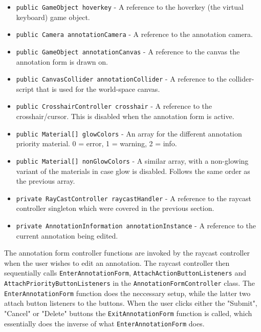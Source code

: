 \begin{itemize}
    \item \texttt{public GameObject hoverkey} - A reference to the hoverkey (the virtual keyboard) game object.
    \item \texttt{public Camera annotationCamera} - A reference to the annotation camera.
    \item \texttt{public GameObject annotationCanvas} - A reference to the canvas the annotation form is drawn on.
    \item \texttt{public CanvasCollider annotationCollider} - A reference to the collider-script that is used for the world-space canvas. 
    \item \texttt{public CrosshairController crosshair} - A reference to the crosshair/cursor. This is disabled when the annotation form is active.
    \item \texttt{public Material[] glowColors} - An array for the different annotation priority material.  0 = error, 1 = warning, 2 = info.
    \item \texttt{public Material[] nonGlowColors} - A similar array, with a non-glowing variant of the materials in case glow is disabled. Follows the same order as the previous array.
    \item \texttt{private RayCastController raycastHandler} - A reference to the raycast controller singleton which were covered in the previous section.
    \item \texttt{private AnnotationInformation annotationInstance} - A reference to the current annotation being edited.
\end{itemize}

The annotation form controller functions are invoked by the raycast controller when the user wishes to edit an annotation. 
The raycast controller then sequentially calls \texttt{EnterAnnotationForm}, \texttt{AttachActionButtonListeners} and 
\texttt{AttachPriorityButtonListeners} in the \texttt{AnnotationFormController} class. The \texttt{EnterAnnotationForm} function
does the neccessary setup, while the latter two attach button listeners to the buttons. When the user clicks either the 
"Submit", "Cancel" or "Delete" buttons the \texttt{ExitAnnotationForm} function is called, which essentially does the inverse
of what \texttt{EnterAnnotationForm} does. 

